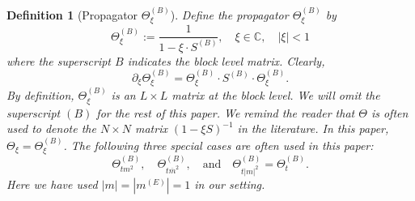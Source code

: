\documentclass[10pt,reqno]{article}
\renewcommand{\bar}{\overline}
\theoremstyle{plain} %
\newtheorem{definition}[theorem]{Definition}
\theoremstyle{remark}
\numberwithin{equation}{section}
\begin{document}
 \begin{definition}[Propagator $\Theta_\xi^{(B)}$]\label{def_Theta}
Define the propagator  $\Theta_\xi^{(B)}$ by 
\begin{equation}\label{def_Thxi}
    \Theta^{(B)}_\xi := \frac{1}{1 - \xi \cdot S^{(B)}}, \quad \xi \in \mathbb{C}, \quad |\xi| < 1
\end{equation}
where the superscript $B$  indicates the block level matrix. Clearly, 
\begin{equation}\label{deri_Thxi}
    \partial_\xi \Theta^{(B)}_\xi = \Theta^{(B)}_\xi \cdot S^{(B)} \cdot \Theta^{(B)}_\xi.
\end{equation}
By definition, $\Theta_\xi^{(B)}$ is an \(L \times L\) matrix at the block level. We will 
omit the superscript \((B)\) for the rest of this paper. We remind the reader that $\Theta$
is often used to denote the \(N \times N\) matrix 
 \((1 - \xi S)^{-1}\) in the literature.   In this paper,  $\Theta_\xi= \Theta_\xi^{(B)}$.
The following  three special  cases are often used in this paper: 
\[
\Theta^{(B)}_{t m^2}, \quad \Theta^{(B)}_{t \bar{m}^2}, \quad \text{and} \quad \Theta^{(B)}_{t |m|^2} = \Theta^{(B)}_{t}.
\]
Here we have used \(|m| = |m^{(E)}|=1\) in our setting. 


\end{definition}
\end{document}
